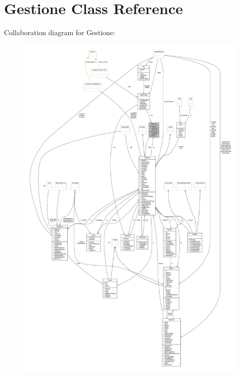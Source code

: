 \hypertarget{classblocchi_1_1_gestione}{}\section{Gestione Class Reference}
\label{classblocchi_1_1_gestione}


Collaboration diagram for Gestione\+:
\nopagebreak
\begin{figure}[H]
\begin{center}
\leavevmode
\includegraphics[width=350pt]{classblocchi_1_1_gestione__coll__graph}
\end{center}
\end{figure}
